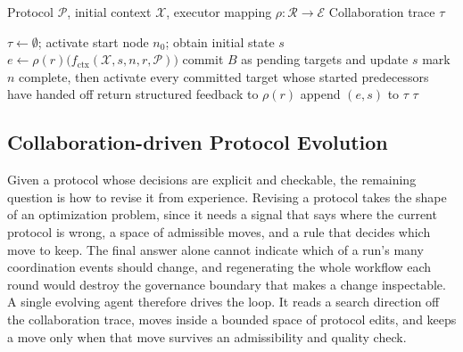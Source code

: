 \documentclass{article} %
\begin{document}
\begin{algorithm}[t]
\footnotesize
\caption{Collaboration under a Governed Protocol}
\label{alg:protocol}
\begin{algorithmic}[1]
\renewcommand{\algorithmicrequire}{\textbf{Input:}}
\Require Protocol $\mathcal{P}$, initial context $\mathcal{X}$, executor mapping $\rho\colon\mathcal{R}\to\mathcal{E}$
\renewcommand{\algorithmicrequire}{\textbf{Output:}}
\Require Collaboration trace $\tau$

\State $\tau \gets \emptyset$; activate start node $n_0$; obtain initial state $s$
        \State $e \gets \rho(r)\bigl(f_{\mathrm{ctx}}(\mathcal{X}, s, n, r, \mathcal{P})\bigr)$ 
            \State commit $B$ as pending targets and update $s$
            \State mark $n$ complete, then activate every committed target whose started predecessors have handed off
        \Else
            \State return structured feedback to $\rho(r)$ 
        \EndIf
        \State append $(e, s)$ to $\tau$ 
    \EndFor
\EndWhile
\State \Return $\tau$
\end{algorithmic}
\end{algorithm}

\subsection{Collaboration-driven Protocol Evolution}
\label{sec:self_evolving}

Given a protocol whose decisions are explicit and checkable, the remaining question is how to revise it from experience. Revising a protocol takes the shape of an optimization problem, since it needs a signal that says where the current protocol is wrong, a space of admissible moves, and a rule that decides which move to keep. The final answer alone cannot indicate which of a run's many coordination events should change, and regenerating the whole workflow each round would destroy the governance boundary that makes a change inspectable. A single evolving agent therefore drives the loop. It reads a search direction off the collaboration trace, moves inside a bounded space of protocol edits, and keeps a move only when that move survives an admissibility and quality check.
\end{document}
